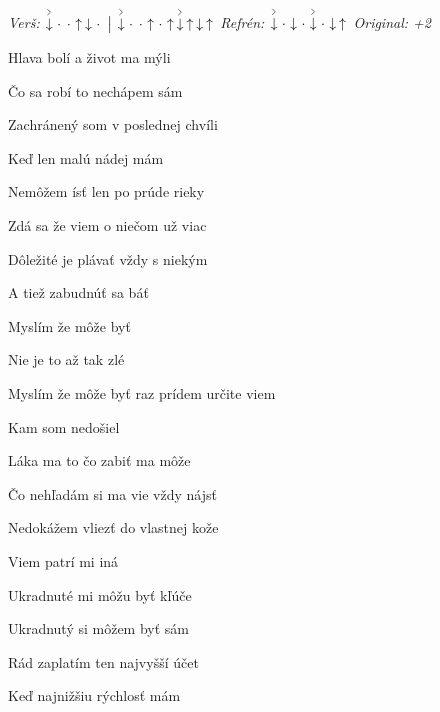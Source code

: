 \begin{song}


 \quad
\textit{Verš:} $\AccentDown\Miss\Miss\Up\Down\Miss \Separator \AccentDown\Miss\Miss\Up\Miss\Up\AccentDown\Up\Down\Up$ \quad
\textit{Refrén:} $\AccentDown\Miss\Down\Miss\AccentDown\Miss\Down\Up$ \quad
\textit{Original: +2}

\large


\Large

\bigskip

Hlava bolí a život ma mýli \par
{}Čo sa robí to nechápem sám \par
{}Zachránený som v poslednej chvíli \par
Keď len malú nádej mám \par

\bigskip

Nemôžem ísť len po prúde rieky \par
{}Zdá sa že viem o niečom už viac \par
{}Dôležité je plávať vždy s niekým \par
A tiež zabudnúť sa báť \par

\bigskip

\begin{chorusbox}{\Refren}
Myslím že môže byť   \par
Nie je to až tak zlé    \par
Myslím že môže byť  raz prídem určite viem \par
Kam som nedošiel \par
\end{chorusbox}

\bigskip

Láka ma to čo zabiť ma môže \par
{}Čo nehľadám si ma vie vždy nájsť \par
{}Nedokážem vliezť do vlastnej kože \par
{}Viem patrí mi iná \par

\bigskip

\Refren

\bigskip

Ukradnuté mi môžu byť kľúče \par
{}Ukradnutý si môžem byť sám \par
{}Rád zaplatím ten najvyšší účet \par
Keď najnižšiu rýchlosť mám \par

\bigskip

\Refren

\end{song}
